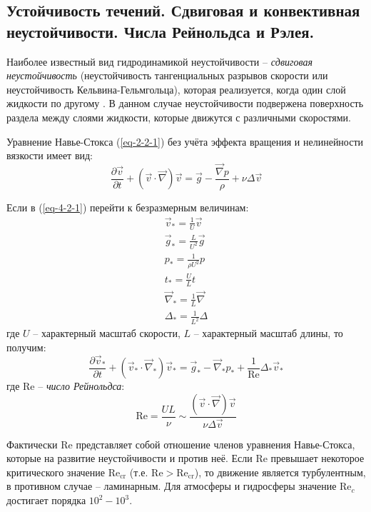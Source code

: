 \subsection{Устойчивость течений. Сдвиговая и конвективная неустойчивости. Числа Рейнольдса и Рэлея.}
Наиболее известный вид гидродинамикой неустойчивости – \textit{сдвиговая неустойчивость} (неустойчивость тангенциальных разрывов скорости или неустойчивость Кельвина-Гельмгольца), которая реализуется, когда один слой жидкости  по другому \cite{Носов-2013}.
В данном случае неустойчивости подвержена поверхность раздела между слоями жидкости, которые движутся с различными скоростями.

Уравнение Навье-Стокса (\ref{eq-2-2-1}) без учёта эффекта вращения и нелинейности вязкости имеет вид:
\begin{equation}\label{eq-4-2-1}
\frac{\partial\vec{v}}{\partial t}+\left(\vec{v}\cdot\vec{\nabla}\right)\vec{v}=\vec{g}-\frac{\vec{\nabla}p}{\rho}+\nu\Delta\vec{v}
\end{equation}

Если в (\ref{eq-4-2-1}) перейти к безразмерным величинам:
\begin{equation}
\begin{gathered}
\vec{v}_{*}=\frac{1}{U}\vec{v}
\\
\vec{g}_{*}=\frac{L}{U^2}\vec{g}
\\
p_{*}=\frac{1}{\rho U^2}p
\\
t_{*}=\frac{U}{L}t
\\
\vec{\nabla}_{*}=\frac{1}{L}\vec{\nabla}
\\
\Delta_{*}=\frac{1}{L^2}\Delta
\end{gathered}
\end{equation}
где $U$ -- характерный масштаб скорости, $L$ -- характерный масштаб длины, то получим:
\begin{equation}
\frac{\partial\vec{v}_{*}}{\partial t}+\left(\vec{v}_{*}\cdot\vec{\nabla}_{*}\right)\vec{v}_{*}=\vec{g}_{*}-\vec{\nabla}_{*}p_{*}+\frac{1}{\text{Re}}\Delta_{*}\vec{v}_{*}
\end{equation}
где Re -- \textit{число Рейнольдса}:
\begin{equation}
\text{Re}=\frac{UL}{\nu}\sim\frac{\left(\vec{v}\cdot\vec{\nabla}\right)\vec{v}}{\nu\Delta\vec{v}}
\end{equation}

Фактически Re представляет собой отношение членов уравнения Навье-Стокса, которые  на развитие неустойчивости и против неё.
Если Re превышает некоторое критического значение $\text{Re}_\text{cr}$ (т.е. $\text{Re}>\text{Re}_\text{cr}$), то движение является турбулентным, в противном случае -- ламинарным.
Для атмосферы и гидросферы значение $\text{Re}_c$ достигает порядка $10^2-10^3$.

